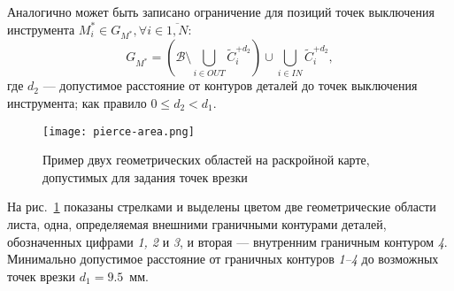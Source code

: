 Аналогично может быть записано ограничение для
позиций точек выключения инструмента
$M^*_i \in G_{M^*}, \forall i \in \overline{1, N}$:
$$
G_{M^*} = \left(\mathcal B \setminus \bigcup_{i \in OUT} \widetilde C_i^{+d_2} \right)
  \cup \bigcup_{i \in IN} \widetilde C_i^{+d_2}
  ,
$$
где
$d_2$ --- допустимое расстояние
от контуров деталей до точек выключения инструмента;
как правило
$0 \leqslant d_2 < d_1$.

\begin{figure}
  \centering
  \texttt{[image: pierce-area.png]}
  \caption{
    Пример двух геометрических областей на раскройной карте,
    допустимых для задания точек врезки
  }
  \label{fig:cut.pierce-area}
\end{figure}

На рис.~\ref{fig:cut.pierce-area}
показаны стрелками и выделены цветом
две геометрические области листа,
одна, определяемая
внешними граничными контурами деталей,
обозначенных цифрами
\textit{1, 2} и \textit{3},
и вторая ---
внутренним граничным контуром
\textit{4}.
Минимально допустимое расстояние
от граничных контуров
\textit{1--4} до возможных точек врезки
$d_1=9.5$~мм.
